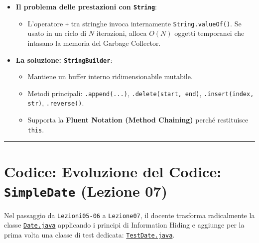 \documentclass[11pt,a4paper,oneside]{report}
\newcommand{\passthrough}[1]{#1}
\providecommand{\tightlist}{\setlength{\itemsep}{0pt}\setlength{\parskip}{0pt}}
\begin{document}
\begin{itemize}
\tightlist
\item
  \textbf{Il problema delle prestazioni con
  \passthrough{\lstinline!String!}}:

  \begin{itemize}
  \tightlist
  \item
    L'operatore \passthrough{\lstinline!+!} tra stringhe invoca
    internamente \passthrough{\lstinline!String.valueOf()!}. Se usato in
    un ciclo di \(N\) iterazioni, alloca \(O(N)\) oggetti temporanei che
    intasano la memoria del Garbage Collector.
  \end{itemize}
\item
  \textbf{La soluzione: \passthrough{\lstinline!StringBuilder!}}:

  \begin{itemize}
  \tightlist
  \item
    Mantiene un buffer interno ridimensionabile mutabile.
  \item
    Metodi principali: \passthrough{\lstinline!.append(...)!},
    \passthrough{\lstinline!.delete(start, end)!},
    \passthrough{\lstinline!.insert(index, str)!},
    \passthrough{\lstinline!.reverse()!}.
  \item
    Supporta la \textbf{Fluent Notation (Method Chaining)} perché
    restituisce \passthrough{\lstinline!this!}.
  \end{itemize}
\end{itemize}

\begin{center}\rule{0.5\linewidth}{0.5pt}\end{center}

\section{\texorpdfstring{Codice: Evoluzione del Codice:
\texttt{SimpleDate} (Lezione
07)}{Codice: Evoluzione del Codice: SimpleDate (Lezione 07)}}\label{chap06_codice-evoluzione-del-codice-simpledate-lezione-07}

Nel passaggio da \passthrough{\lstinline!Lezioni05-06!} a
\passthrough{\lstinline!Lezione07!}, il docente trasforma radicalmente
la classe
\href{file:///home/wally/Documenti/GitHub/Programmazione-II/25-26/Teoria-e-Esercitazioni/Codice-20260902/Lezione07/SimpleDate/src/Date.java}{\passthrough{\lstinline!Date.java!}}
applicando i principi di Information Hiding e aggiunge per la prima
volta una classe di test dedicata:
\href{file:///home/wally/Documenti/GitHub/Programmazione-II/25-26/Teoria-e-Esercitazioni/Codice-20260902/Lezione07/SimpleDate/src/TestDate.java}{\passthrough{\lstinline!TestDate.java!}}.
\end{document}

